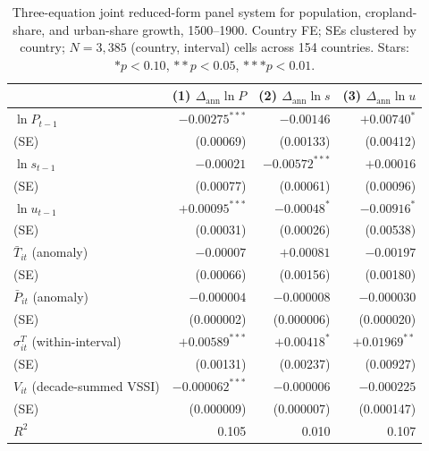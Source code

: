 \documentclass[11pt,letterpaper]{article}
\begin{document}
\begin{table}[H]
\centering
\caption{Three-equation joint reduced-form panel system for population, cropland-share, and urban-share growth, 1500--1900. Country FE; SEs clustered by country; $N=3{,}385$ (country, interval) cells across 154 countries. Stars: $* p<0.10$, $** p<0.05$, $*** p<0.01$.}
\label{tab:joint-var}
\small
\begin{tabular}{lrrr}
\toprule
 & (1) $\Delta_{\text{ann}} \ln P$ & (2) $\Delta_{\text{ann}} \ln s$ & (3) $\Delta_{\text{ann}} \ln u$ \\
\midrule
$\ln P_{t-1}$                          & $-0.00275^{***}$ & $-0.00146$        & $+0.00740^{*}$    \\
\quad (SE)                              & (0.00069)        & (0.00133)         & (0.00412)          \\
$\ln s_{t-1}$                          & $-0.00021$       & $-0.00572^{***}$  & $+0.00016$         \\
\quad (SE)                              & (0.00077)        & (0.00061)         & (0.00096)          \\
$\ln u_{t-1}$                          & $+0.00095^{***}$ & $-0.00048^{*}$    & $-0.00916^{*}$     \\
\quad (SE)                              & (0.00031)        & (0.00026)         & (0.00538)          \\
$\bar T_{it}$ (anomaly)                & $-0.00007$       & $+0.00081$        & $-0.00197$         \\
\quad (SE)                              & (0.00066)        & (0.00156)         & (0.00180)          \\
$\bar P_{it}$ (anomaly)                & $-0.000004$      & $-0.000008$       & $-0.000030$        \\
\quad (SE)                              & (0.000002)       & (0.000006)        & (0.000020)         \\
$\sigma^T_{it}$ (within-interval)      & $+0.00589^{***}$ & $+0.00418^{*}$    & $+0.01969^{**}$    \\
\quad (SE)                              & (0.00131)        & (0.00237)         & (0.00927)          \\
$V_{it}$ (decade-summed VSSI)          & $-0.000062^{***}$& $-0.000006$       & $-0.000225$        \\
\quad (SE)                              & (0.000009)       & (0.000007)        & (0.000147)         \\
\midrule
$R^2$                                  & 0.105             & 0.010              & 0.107               \\
\bottomrule
\end{tabular}
\end{table}
\end{document}
